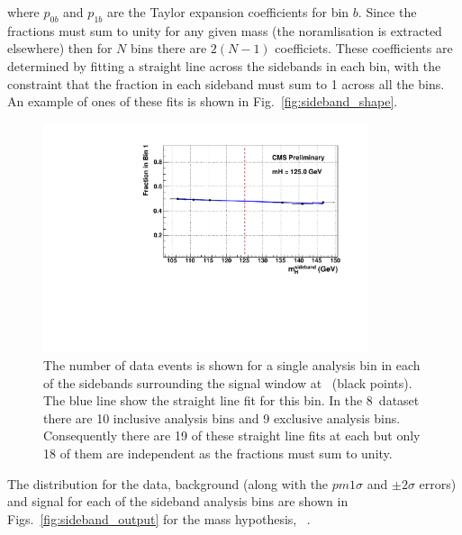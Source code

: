 where $p_{0b}$ and $p_{1b}$ are the Taylor expansion coefficients for bin $b$. Since the fractions must sum to unity for any given mass (the noramlisation is extracted elsewhere) then for $N$ bins there are $2(N-1)$ coefficiets. These coefficients are determined by fitting a straight line across the sidebands in each bin, with the constraint that the fraction in each sideband must sum to 1 across all the bins. An example of ones of these fits is shown in Fig.~\ref{fig:sideband_shape}.

\begin{figure}
  \begin{center}
    \includegraphics[width=0.85\textwidth]{ch5_anal_and_results/plots/sideband/sideband_fit.pdf}
    \caption{The number of data events is shown for a single analysis bin in each of the sidebands surrounding the signal window at ~\GeV (black points). The blue line show the straight line fit for this bin. In the 8~\TeV dataset there are 10 inclusive analysis bins and 9 exclusive analysis bins. Consequently there are 19 of these straight line fits at each \mH but only 18 of them are independent as the fractions must sum to unity.}
    \label{fig:sideband_norm}
  \end{center}
\end{figure}

The distribution for the data, background (along with the $pm1\sigma$ and $\pm2\sigma$ errors) and signal for each of the sideband analysis bins are shown in Figs.~\ref{fig:sideband_output} for the mass hypothesis, ~\GeV.

